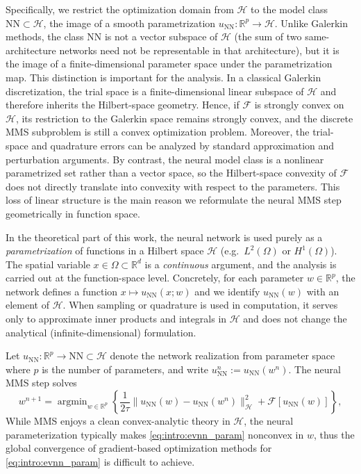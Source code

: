 \documentclass[twoside,11pt]{article}
\newcommand{\R}{\mathbb{R}}
\newcommand{\NN}{\mathrm{NN}}
\newcommand{\argmin}{\mathop{\mathrm{arg min}}}
\newcommand{\calF}{\mathcal{F}}
\newcommand{\calH}{\mathcal{H}}
\begin{document}
Specifically, we restrict the optimization domain from $\calH$ to the model class $\NN\subset \calH$, the image of a smooth parametrization $u_\NN:\R^p\to\calH$. Unlike Galerkin methods, the class $\NN$ is not a vector subspace of $\calH$ (the sum of two same-architecture networks need not be representable in that architecture), but it is the image of a finite-dimensional parameter space under the parametrization map. 
This distinction is important for the analysis. In a classical Galerkin
discretization, the trial space is a finite-dimensional linear subspace of
$\calH$ and therefore inherits the Hilbert-space geometry. Hence, if $\calF$ is
strongly convex on $\calH$, its restriction to the Galerkin space remains
strongly convex, and the discrete MMS subproblem is still a convex optimization
problem. Moreover, the trial-space and quadrature errors can be analyzed by
standard approximation and perturbation arguments. By contrast, the neural model
class is a nonlinear parametrized set rather than a vector space, so the
Hilbert-space convexity of $\calF$ does not directly translate into convexity
with respect to the parameters. This loss of linear structure is the main reason
we reformulate the neural MMS step geometrically in function space.

In the theoretical part of this work, the neural network is used purely as a \emph{parametrization} of functions in a Hilbert space
$\mathcal H$ (e.g.\ $L^2(\Omega)$ or $H^1(\Omega)$). The spatial variable $x\in\Omega\subset\mathbb R^d$ is a
\emph{continuous} argument, and the analysis is carried out at the function-space level.
Concretely, for each parameter $w\in\mathbb R^p$, the network defines a function
$x\mapsto u_{\NN}(x;w)$ and we identify $u_{\NN}(w)$ with an element of $\mathcal H$.
When sampling or quadrature is used in computation, it serves only to approximate inner products and integrals in $\mathcal H$ and does not change the analytical (infinite-dimensional) formulation.


Let $u_{\NN}:\mathbb{R}^p\to \NN\subset \calH$ denote the network realization from parameter space where $p$ is the number of parameters, and write $u^n_{\NN}:=u_{\NN}(w^n)$. The neural MMS step solves
\begin{equation}\label{eq:intro:evnn_param}
w^{n+1} = \argmin_{w\in\mathbb{R}^p}\left\{\frac{1}{2\tau}\|u_{\NN}(w)-u_{\NN}(w^n)\|_\calH^2 + \calF[u_{\NN}(w)]\right\},
\end{equation}
While MMS enjoys a clean convex-analytic theory in $\calH$, the neural parameterization typically makes \eqref{eq:intro:evnn_param} nonconvex in $w$, thus the global convergence of gradient-based optimization methods for \eqref{eq:intro:evnn_param} is difficult to achieve. 
\end{document}
